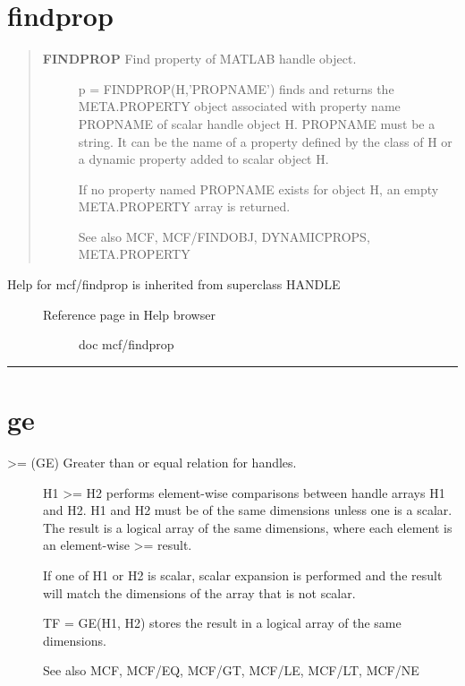 \documentclass[letterpaper,10pt,english]{sphinxmanual}
\begin{document}
\section{findprop}
\label{classes/utils/@mcf/mcf:id11}\label{classes/utils/@mcf/mcf:findprop}\begin{quote}
\begin{description}
\item[{\textbf{FINDPROP}   Find property of MATLAB handle object.}] \leavevmode
p = FINDPROP(H,'PROPNAME') finds and returns the META.PROPERTY object
associated with property name PROPNAME of scalar handle object H.
PROPNAME must be a string.  It can be the name of a property defined
by the class of H or a dynamic property added to scalar object H.

If no property named PROPNAME exists for object H, an empty
META.PROPERTY array is returned.

See also MCF, MCF/FINDOBJ, DYNAMICPROPS, META.PROPERTY

\end{description}
\end{quote}
\begin{description}
\item[{Help for mcf/findprop is inherited from superclass HANDLE}] \leavevmode\begin{description}
\item[{Reference page in Help browser}] \leavevmode
doc mcf/findprop

\end{description}

\end{description}


\bigskip\hrule{}\bigskip



\section{ge}
\label{classes/utils/@mcf/mcf:ge}\label{classes/utils/@mcf/mcf:id12}\begin{description}
\item[{\textgreater{}= (GE)   Greater than or equal relation for handles.}] \leavevmode
H1 \textgreater{}= H2 performs element-wise comparisons between handle arrays H1 and
H2.  H1 and H2 must be of the same dimensions unless one is a scalar.
The result is a logical array of the same dimensions, where each
element is an element-wise \textgreater{}= result.

If one of H1 or H2 is scalar, scalar expansion is performed and the
result will match the dimensions of the array that is not scalar.

TF = GE(H1, H2) stores the result in a logical array of the same
dimensions.

See also MCF, MCF/EQ, MCF/GT, MCF/LE, MCF/LT, MCF/NE

\end{description}
\end{document}

